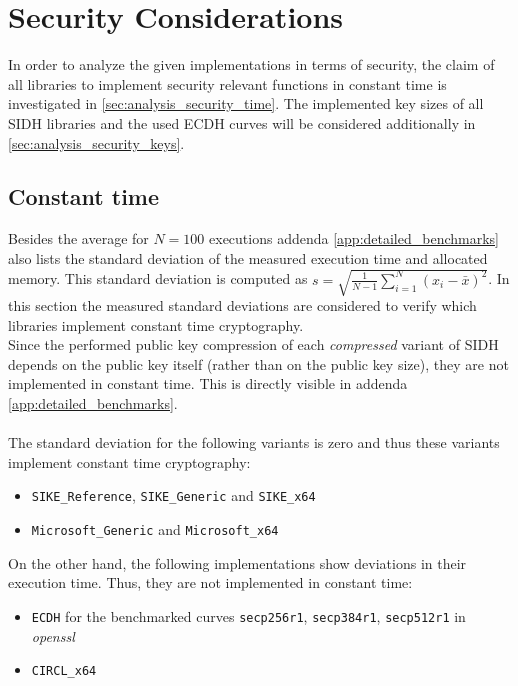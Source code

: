 \section{Security Considerations}\label{sec:analysis_security}

In order to analyze the given implementations in terms of security, the claim of all libraries to implement security relevant functions in constant time is investigated in \autoref{sec:analysis_security_time}. The implemented key sizes of all \gls{SIDH} libraries and the used \gls{ECDH} curves will be considered additionally in \autoref{sec:analysis_security_keys}.

\subsection{Constant time}\label{sec:analysis_security_time}
Besides the average for $N=100$ executions addenda \ref{app:detailed_benchmarks} also lists the standard deviation of the measured execution time and allocated memory. This standard deviation is computed as $s=\sqrt{\frac{1}{N-1}\sum_{i=1}^N(x_i-\bar{x})^2}$. In this section the measured standard deviations are considered to verify which libraries implement constant time cryptography.\\
Since the performed public key compression of each \textit{compressed} variant of \gls{SIDH} depends on the public key itself (rather than on the public key size), they are not implemented in constant time. This is directly visible in  addenda \ref{app:detailed_benchmarks}.\\\\
The standard deviation for the following variants is zero and thus these variants implement constant time cryptography:
\begin{itemize}
\item \texttt{SIKE\_Reference}, \texttt{SIKE\_Generic} and \texttt{SIKE\_x64}
\item \texttt{Microsoft\_Generic} and \texttt{Microsoft\_x64}
\end{itemize}
On the other hand, the following implementations show deviations in their execution time. Thus, they are not implemented in constant time:

\begin{itemize}
\item \texttt{\gls{ECDH}} for the benchmarked curves \texttt{secp256r1},  \texttt{secp384r1}, \texttt{secp512r1} in \textit{\gls{openssl}}
\item \texttt{\gls{CIRCL}\_x64}
\end{itemize}

